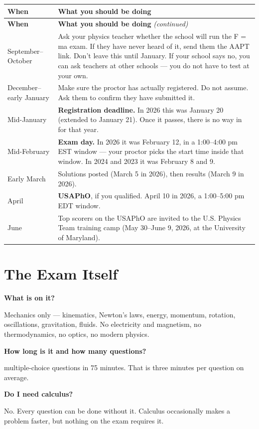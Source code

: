 \documentclass[11pt]{article}
\newcommand{\Q}[1]{\par\medskip\noindent\textbf{\color{qblue}#1}\par\nobreak\vspace{1pt}\nobreak}
\begin{document}
\begin{longtable}{p{}p{}}
\hline
\textbf{When} & \textbf{What you should be doing} \\
\hline
\endfirsthead
\hline
\textbf{When} & \textbf{What you should be doing} \emph{(continued)} \\
\hline
\endhead
September--October &
Ask your physics teacher whether the school will run the F = ma exam. If they have never
heard of it, send them the AAPT link. Don't leave this until January. If your school says
no, you can ask teachers at other schools --- you do not have to test at your own. \\[3pt]
December--early January &
Make sure the proctor has actually registered. Do not assume. Ask them to confirm they
have submitted it. \\[3pt]
Mid-January &
\textbf{Registration deadline.} In 2026 this was January 20 (extended to January 21). Once
it passes, there is no way in for that year. \\[3pt]
Mid-February &
\textbf{Exam day.} In 2026 it was February 12, in a 1:00--4:00 pm EST window --- your
proctor picks the start time inside that window. In 2024 and 2023 it was February 8 and 9. \\[3pt]
Early March &
Solutions posted (March 5 in 2026), then results (March 9 in 2026). \\[3pt]
April &
\textbf{USAPhO}, if you qualified. April 10 in 2026, a 1:00--5:00 pm EDT window. \\[3pt]
June &
Top scorers on the USAPhO are invited to the U.S. Physics Team training camp
(May 30--June 9, 2026, at the University of Maryland). \\
\hline
\end{longtable}

\section{The Exam Itself}

\Q{What is on it?}
Mechanics only --- kinematics, Newton's laws, energy, momentum, rotation, oscillations,
gravitation, fluids. No electricity and magnetism, no thermodynamics, no optics, no modern
physics.

\Q{How long is it and how many questions?}
25 multiple-choice questions in 75 minutes. That is three minutes per question on average.

\Q{Do I need calculus?}
No. Every question can be done without it. Calculus occasionally makes a problem faster,
but nothing on the exam requires it.
\end{document}
